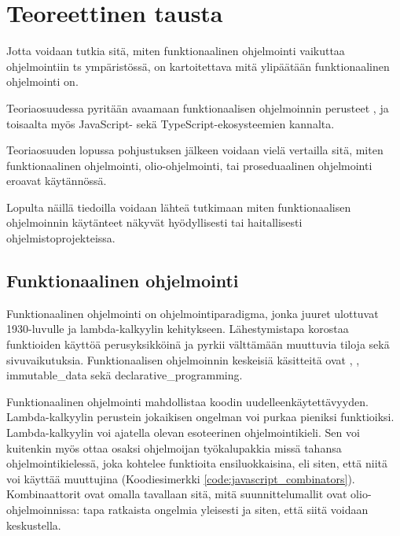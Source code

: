 \vspace{21.5pt}
\chapter{Teoreettinen tausta}

Jotta voidaan tutkia sitä, miten funktionaalinen ohjelmointi vaikuttaa ohjelmointiin \gls{ts} ympäristössä, on kartoitettava mitä ylipäätään funktionaalinen ohjelmointi on.

Teoriaosuudessa pyritään avaamaan funktionaalisen ohjelmoinnin perusteet , ja toisaalta myös JavaScript- sekä TypeScript-ekosysteemien kannalta.

Teoriaosuuden lopussa pohjustuksen jälkeen voidaan vielä vertailla sitä, miten funktionaalinen ohjelmointi, olio-ohjelmointi, tai proseduaalinen ohjelmointi eroavat käytännössä.

Lopulta näillä tiedoilla voidaan lähteä tutkimaan miten funktionaalisen ohjelmoinnin käytänteet näkyvät hyödyllisesti tai haitallisesti ohjelmistoprojekteissa.

\section{Funktionaalinen ohjelmointi}

Funktionaalinen ohjelmointi on ohjelmointiparadigma, jonka juuret ulottuvat 1930-luvulle ja lambda-kalkyylin kehitykseen. Lähestymistapa korostaa funktioiden käyttöä perusyksikköinä ja pyrkii välttämään muuttuvia tiloja sekä sivuvaikutuksia. Funktionaalisen ohjelmoinnin keskeisiä käsitteitä ovat , , \gls{immutable_data} sekä \gls{declarative_programming}. \citep{Tan2004}

Funktionaalinen ohjelmointi mahdollistaa koodin uudelleenkäytettävyyden. Lambda-kalkyylin perustein jokaikisen ongelman voi purkaa pieniksi funktioiksi. \citep{BlellochHarper2015} Lambda-kalkyylin voi ajatella olevan esoteerinen ohjelmointikieli. Sen voi kuitenkin myös ottaa osaksi ohjelmoijan työkalupakkia missä tahansa ohjelmointikielessä, joka kohtelee funktioita ensiluokkaisina, eli siten, että niitä voi käyttää muuttujina (Koodiesimerkki \ref{code:javascript_combinators}). Kombinaattorit ovat omalla tavallaan sitä, mitä suunnittelumallit ovat olio-ohjelmoinnissa: tapa ratkaista ongelmia yleisesti ja siten, että siitä voidaan keskustella.

